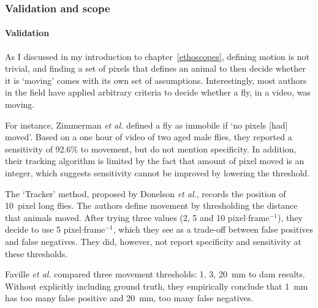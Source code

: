 
\subsubsection{Validation and scope}

\paragraph*{Validation}
As I discussed in my introduction to chapter~\ref{ethoscopes}, defining motion is not trivial,
and finding a set of pixels that defines an animal to then decide whether it is `moving' comes with its own set of assumptions.
Interestingly, most authors in the field have applied arbitrary criteria to decide whether a fly, in a video, was moving.

For instance, Zimmerman \emph{et al.} defined a fly as immobile if `no pixels [had] moved'. 
Based on a one hour of video of two aged male flies, they reported a sensitivity of 92.6\% to movement, but do not mention specificity. 
In addition, their tracking algorithm is limited by the fact that amount of pixel moved is an integer, which suggests sensitivity cannot be improved by lowering the threshold.

The `Tracker' method, proposed by Donelson \emph{et al.}, records the position of 10~pixel long flies. 
The authors define movement by thresholding the distance that animals moved. 
After trying three values (2, 5 and 10 pixel$\cdot$frame$^{-1}$), they decide to use 5 pixel$\cdot$frame$^{-1}$,
which they see as a trade-off between false positives and false negatives. 
They did, however, not report specificity and sensitivity at these thresholds.


Faville \emph{et al.} compared three movement thresholds: 1, 3, 20~mm to \gls{dam} results.
Without explicitly including ground truth, they empirically conclude that 1~mm has too many false positive 
and 20~mm, too many false negatives.

